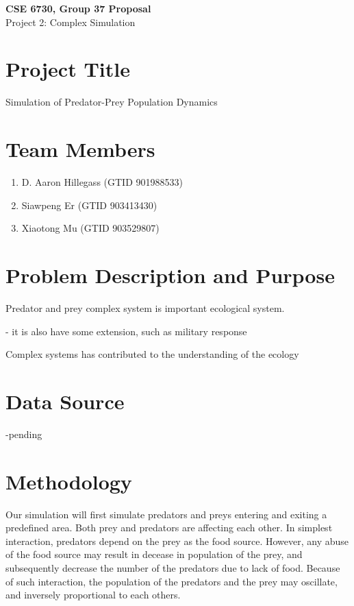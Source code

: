 \documentclass{article}
\begin{document}
	\begin{center}
		
		\LARGE{\textbf{CSE 6730, Group 37 Proposal}} \\
		\vspace{1em}
		\Large{Project 2: Complex Simulation} \\
		
	\end{center}
	\begin{normalsize}
		
		\section{Project Title}
		
		Simulation of Predator-Prey Population Dynamics
		
		\section{Team Members}
		
		\begin{enumerate}
			\item D. Aaron Hillegass (GTID 901988533)
			\item Siawpeng Er (GTID 903413430)
			\item Xiaotong Mu (GTID 903529807)
		\end{enumerate}
		
		\section{Problem Description and Purpose}
		Predator and prey complex system is important ecological system. 
		
		- it is also have some extension, such as military response
		
		Complex systems has contributed to the understanding of the ecology
		
		\section{Data Source}
		-pending
		
		\section{Methodology}
		Our simulation will first simulate predators and preys entering and exiting a predefined area. Both prey and predators are affecting each other. In simplest interaction, predators depend on the prey as the food source. However, any abuse of the food source may result in decease in population of the prey, and subsequently decrease the number of the predators due to lack of food. Because of such interaction, the population of the predators and the prey may oscillate, and inversely proportional to each others. 
		

\end{normalsize}
\end{document}
